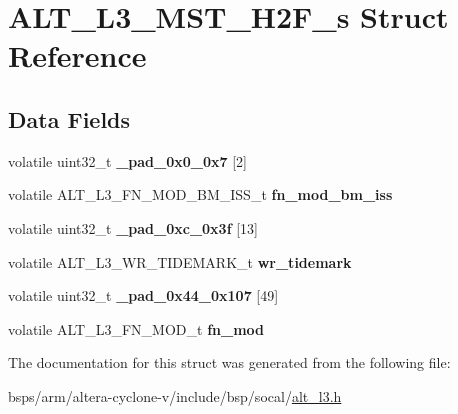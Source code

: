 \hypertarget{structALT__L3__MST__H2F__s}{}\section{A\+L\+T\+\_\+\+L3\+\_\+\+M\+S\+T\+\_\+\+H2\+F\+\_\+s Struct Reference}
\label{structALT__L3__MST__H2F__s}
\subsection*{Data Fields}
\begin{DoxyCompactItemize}
\item 
\mbox{\label{structALT__L3__MST__H2F__s_ac2bd02f4329d27e0013608df6d25f9fa}} 
volatile uint32\+\_\+t {\bfseries \+\_\+pad\+\_\+0x0\+\_\+0x7} \mbox{[}2\mbox{]}
\item 
\mbox{\label{structALT__L3__MST__H2F__s_a833ef368c8b9653836e9b5b40d154dcb}} 
volatile A\+L\+T\+\_\+\+L3\+\_\+\+F\+N\+\_\+\+M\+O\+D\+\_\+\+B\+M\+\_\+\+I\+S\+S\+\_\+t {\bfseries fn\+\_\+mod\+\_\+bm\+\_\+iss}
\item 
\mbox{\label{structALT__L3__MST__H2F__s_a2004eb03f803e319079607011eb6a96e}} 
volatile uint32\+\_\+t {\bfseries \+\_\+pad\+\_\+0xc\+\_\+0x3f} \mbox{[}13\mbox{]}
\item 
\mbox{\label{structALT__L3__MST__H2F__s_abed8bef0fecb91dc14a1eab83b1b5d65}} 
volatile A\+L\+T\+\_\+\+L3\+\_\+\+W\+R\+\_\+\+T\+I\+D\+E\+M\+A\+R\+K\+\_\+t {\bfseries wr\+\_\+tidemark}
\item 
\mbox{\label{structALT__L3__MST__H2F__s_aebcf487a5873a531f8e0e03008426fa4}} 
volatile uint32\+\_\+t {\bfseries \+\_\+pad\+\_\+0x44\+\_\+0x107} \mbox{[}49\mbox{]}
\item 
\mbox{\label{structALT__L3__MST__H2F__s_ad720ee11ba5cc16e823cfc92754f8421}} 
volatile A\+L\+T\+\_\+\+L3\+\_\+\+F\+N\+\_\+\+M\+O\+D\+\_\+t {\bfseries fn\+\_\+mod}
\end{DoxyCompactItemize}


The documentation for this struct was generated from the following file\+:\begin{DoxyCompactItemize}
\item 
bsps/arm/altera-\/cyclone-\/v/include/bsp/socal/\mbox{\hyperlink{alt__l3_8h}{alt\+\_\+l3.\+h}}\end{DoxyCompactItemize}
